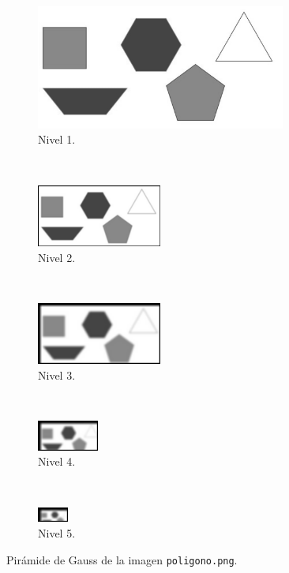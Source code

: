 \documentclass[12pt, letterpaper]{article}
\begin{document}
\begin{figure}[H]
  \centering
  \begin{subfigure}[t]{0.48\textwidth}
    \centering
    \includegraphics[width = 0.9\textwidth]{poligono/gp1.png}
    \caption{Nivel 1.}
  \end{subfigure}
  ~ 
  \begin{subfigure}[t]{0.48\textwidth}
      \centering
      \includegraphics[width = 0.45\textwidth]{poligono/gp2.png}
      \caption{Nivel 2.}
  \end{subfigure}
  ~ 
  \begin{subfigure}[t]{0.32\textwidth}
      \centering
      \includegraphics[width = 0.45\textwidth]{poligono/gp3.png}
      \caption{Nivel 3.}
  \end{subfigure}
  ~ 
  \begin{subfigure}[t]{0.32\textwidth}
      \centering
      \includegraphics[width = 0.22\textwidth]{poligono/gp4.png}
      \caption{Nivel 4.}
  \end{subfigure}
  ~ 
  \begin{subfigure}[t]{0.32\textwidth}
      \centering
      \includegraphics[width = 0.11\textwidth]{poligono/gp5.png}
      \caption{Nivel 5.}
  \end{subfigure}
  \caption{Pirámide de Gauss de la imagen \texttt{poligono.png}.}
  \label{gppoligono}
\end{figure}
\end{document}
